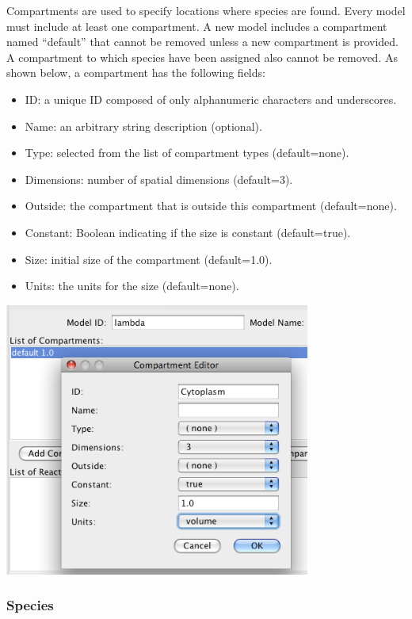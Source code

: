 \documentclass[titlepage,11pt]{article}
\begin{document}
\noindent
Compartments are used to specify locations where species are
found. Every model must include at least one compartment. A new
model includes a compartment named ``default'' that
cannot be removed unless a new compartment is provided.
A compartment to which species have been assigned also cannot be removed.  
As shown below, a compartment has the following fields:
\begin{itemize}
\item ID: a unique ID composed of only alphanumeric characters and 
      underscores.
\item Name: an arbitrary string description (optional).
\item Type: selected from the list of compartment types (default=none).
\item Dimensions: number of spatial dimensions (default=3).
\item Outside: the compartment that is outside this compartment 
       (default=none).
\item Constant: Boolean indicating if the size is constant
       (default=true).
\item Size: initial size of the compartment (default=1.0).
\item Units: the units for the size (default=none).
\end{itemize}
\begin{center}
\includegraphics[height=90mm]{screenshots/compartment}
\end{center}

\subsubsection{\label{species}Species}
\end{document}
